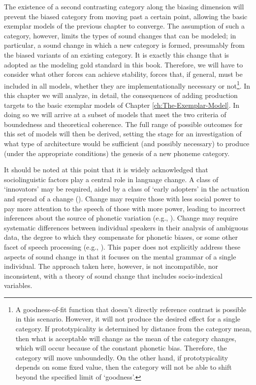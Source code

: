 The existence of a second contrasting category along the biasing dimension
will prevent the biased category from moving past a certain point,
allowing the basic exemplar models of the previous chapter to converge.
The assumption of such a category, however, limits the types of sound
changes that can be modeled; in particular, a sound change in which
a new category is formed, presumably from the biased variants of an
existing category. It is exactly this change that is adopted as the
modeling gold standard in this book. Therefore, we will have to consider
what other forces can achieve stability, forces that, if general,
must be included in all models, whether they are implementationally
necessary or not\footnote{A goodness-of-fit function that doesn't directly reference contrast
is possible in this scenario. However, it will not produce the desired
effect for a single category. If prototypicality is determined by
distance from the category mean, then what is acceptable will change
as the mean of the category changes, which will occur because of the
constant phonetic bias. Therefore, the category will move unboundedly.
On the other hand, if prototypicality depends on some fixed value,
then the category will not be able to shift beyond the specified limit
of `goodness'. }. In this chapter we will analyze, in detail, the consequences of
adding production targets to the basic exemplar models of Chapter
\ref{ch:The-Exemplar-Model}. In doing so we will arrive at a subset
of models that meet the two criteria of boundedness and theoretical
coherence. The full range of possible outcomes for this set of models
will then be derived, setting the stage for an investigation of what
type of architecture would be sufficient (and possibly necessary)
to produce (under the appropriate conditions) the genesis of a new
phoneme category.

It should be noted at this point that it is widely acknowledged that
sociolinguistic factors play a central role in language change. A
class of `innovators' may be required, aided by a class of `early
adopters' in the actuation and spread of a change (\citealt{milroy1985linguistic}).
Change may require those with less social power to pay more attention
to the speech of those with more power, leading to incorrect inferences
about the source of phonetic variation (e.g., \citealt{Garrett2013}).
Change may require systematic differences between individual speakers
in their analysis of ambiguous data, the degree to which they compensate
for phonetic biases, or some other facet of speech processing (e.g.,
\citealp{Beddor2009,yu2013socio}). This paper does not explicitly
address these aspects of sound change in that it focuses on the mental
grammar of a single individual. The approach taken here, however,
is not incompatible, nor inconsistent, with a theory of sound change
that includes socio-indexical variables.

